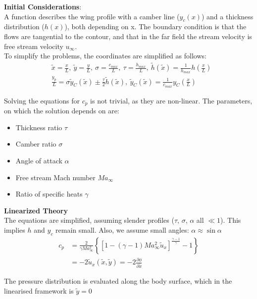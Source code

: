 \documentclass[8pt, landscape, fleqn]{scrartcl}
\begin{document}
\begin{multicols*}{3}
\textbf{Initial Considerations}: \\
A function describes the wing profile with a camber line ($y_c(x)$) and a thickness distribution ($h(x)$), both depending on x. The boundary condition is that the flows are tangential to the contour, and that in the far field the stream velocity is free stream velocity $u_\infty$. \\

To simplify the problems, the coordinates are simplified as follows:
\begin{align*}
   & \tilde{x} = \frac{x}{L},~ \tilde{y} = \frac{y}{L},~ \sigma = \frac{c_{max}}{L},~\tau = \frac{h_{max}}{L},~\tilde{h}(\tilde{x}) = \frac{1}{h_{max}} h\left( \frac{x}{L} \right)\\
   & \frac{y_p}{L} = \sigma\tilde{y}_C(\tilde{x}) \pm \frac{\tau}{2} \tilde{h}(\tilde{x}),~\tilde{y}_C(\tilde{x}) = \frac{1}{c_{max}} y_C \left( \frac{x}{L} \right)
\end{align*}

Solving the equations for $c_p$ is not trivial, as they are non-linear. The parameters, on which the solution depends on are:
\begin{itemize}
    \item Thickness ratio $\tau$
    \item Camber ratio $\sigma$
    \item Angle of attack $\alpha$
    \item Free stream Mach number $Ma_\infty$
    \item Ratio of specific heats $\gamma$
\end{itemize}
\textbf{Linearized Theory} \\
The equations are simplified, assuming slender profiles ($\tau$, $\sigma$, $\alpha$ all $\ll 1$). This implies $h$ and $y_c$ remain small. Also, we assume small angles: $\alpha \approx \sin \alpha$
\begin{align*}
    c_p &= \frac{2}{\gamma Ma_\infty^2} \left\{ \left[ 1 - (\gamma-1)Ma_\infty^2 \tilde{u}_x \right]^{\frac{\gamma-1}{\gamma}}-1 \right\} \\
    & = -2 \tilde{u}_x(\tilde{x},\tilde{y}) = -2 \frac{\partial\phi}{\partial\tilde{x}}
\end{align*}

The pressure distribution is evaluated along the body surface, which in the linearised framework is $\tilde{y} = 0$ \\


\end{multicols*}
\end{document}
